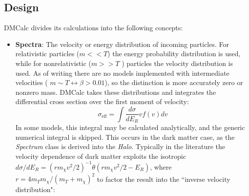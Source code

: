 \subsection{Design}
DMCalc divides its calculations into the following concepts:
\begin{itemize}
    \item \textbf{Spectra}: The velocity or energy distribution of incoming particles.
    For relativistic particles ($m<<T$) the energy probability distribution is used, while for nonrelativistic ($m>>T$ ) particles the velocity distribution is used.
    As of writing there are no models implemented with intermediate velocities ( $m\sim T \leftrightarrow \beta > 0.01$), so the distinction is more accurately zero or nonzero mass.
    DMCalc takes these distributions and integrates the differential cross section over the first moment of velocity:
    \begin{equation}
        \sigma_{\text{eff}} = \int \frac{d \sigma}{d E_R} v f(v) dv
    \end{equation}
    \noindent
    In some models, this integral may be calculated analytically, and the generic numerical integral is skipped.
    This occurs in the dark matter case, as the \textit{Spectrum} class is derived into the \textit{Halo}.
    Typically in the literature the velocity dependence of dark matter exploits the isotropic $d\sigma / dE_R = (r m_\chi v^2/2)^{-1} \theta( r m_\chi v^2/2-E_R)$, where $r = 4 m_T m_\chi /(m_T + m_\chi)^2$ to factor the result into the ``inverse velocity distribution"\cite{mccabe_earths_2014}:
    

\end{itemize}
